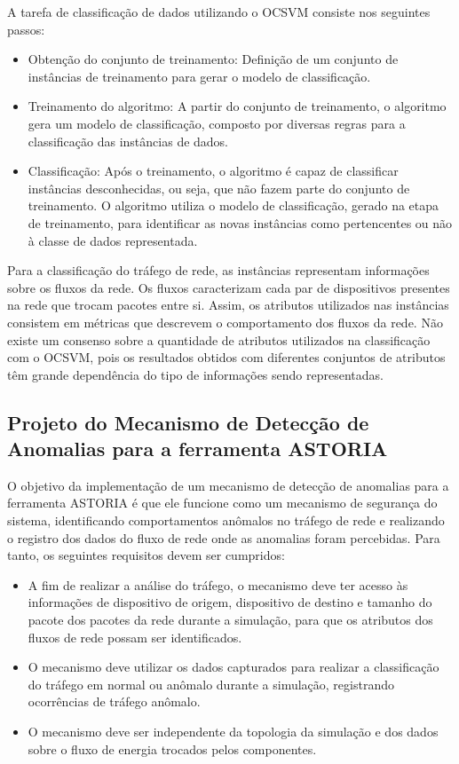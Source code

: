 \documentclass[12pt]{article}
\begin{document}
A tarefa de classificação de dados utilizando o OCSVM consiste nos seguintes passos:
\begin{itemize}
\item{Obtenção do conjunto de treinamento}: Definição de um conjunto de instâncias de treinamento para gerar o modelo de classificação.
\item{Treinamento do algoritmo}: A partir do conjunto de treinamento, o algoritmo gera um modelo de classificação, composto por diversas regras para a classificação das instâncias de dados.
\item{Classificação}: Após o treinamento, o algoritmo é capaz de classificar instâncias desconhecidas, ou seja, que não fazem parte do conjunto de treinamento. O algoritmo utiliza o modelo de classificação, gerado na etapa de treinamento, para identificar as novas instâncias como pertencentes ou não à classe de dados representada.
\end{itemize}

Para a classificação do tráfego de rede, as instâncias representam informações sobre os fluxos da rede. Os fluxos caracterizam cada par de dispositivos presentes na rede que trocam pacotes entre si. Assim, os atributos utilizados nas instâncias consistem em métricas que descrevem o comportamento dos fluxos da rede. Não existe um consenso sobre a quantidade de atributos utilizados na classificação com o OCSVM, pois os resultados obtidos com diferentes conjuntos de atributos têm grande dependência do tipo de informações sendo representadas.

 
\subsection{Projeto do Mecanismo de Detecção de Anomalias para a ferramenta ASTORIA}
\label{secsdiast}
O objetivo da implementação de um mecanismo de detecção de anomalias para a ferramenta ASTORIA é que ele funcione como um mecanismo de segurança do sistema, identificando comportamentos anômalos no tráfego de rede e realizando o registro dos dados do fluxo de rede onde as anomalias foram percebidas. Para tanto, os seguintes requisitos devem ser cumpridos:
\begin{itemize}
\item{} A fim de realizar a análise do tráfego, o mecanismo deve ter acesso às informações de dispositivo de origem, dispositivo de destino e tamanho do pacote dos pacotes da rede durante a simulação, para que os atributos dos fluxos de rede possam ser identificados.
\item{} O mecanismo deve utilizar os dados capturados para realizar a classificação do tráfego em normal ou anômalo durante a simulação, registrando ocorrências de tráfego anômalo.
\item{} O mecanismo deve ser independente da topologia da simulação e dos dados sobre o fluxo de energia trocados pelos componentes.
\end{itemize}
\end{document}
